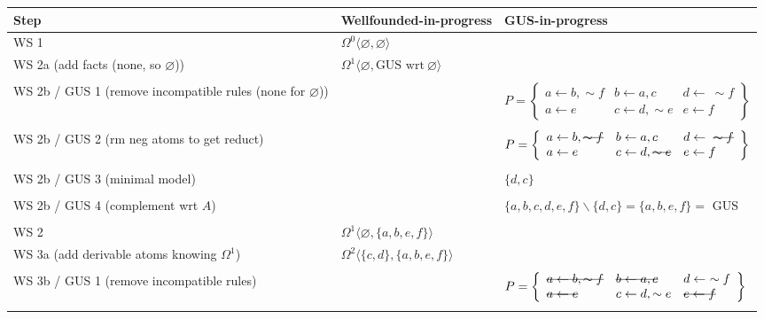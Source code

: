 \documentclass[9pt,a4paper,landscape]{article}
\newcommand{\msout}[1]{\text{\sout{$#1$}}}
\begin{document}
{\begin{center}
	\begin{tabular}{p{5cm}p{5cm}p{7cm}}
		Step & Wellfounded-in-progress & GUS-in-progress\\ \midrule
		WS 1
		& $\Omega^0 \langle \varnothing, \varnothing \rangle$ &\\ \midrule
		WS 2a (add facts (none, so $\varnothing$))
		& $\Omega^1 \langle \varnothing, \text{GUS wrt}\ \varnothing \rangle$ &\\&\\
		WS 2b / GUS 1 (remove incompatible rules (none for $\varnothing$)) 
		&
		& $P = \left\{\begin{array}{lll}
		a \leftarrow b, \sim f & b \leftarrow a, c & d \leftarrow\ \sim f\\
		a \leftarrow e & c \leftarrow d, \sim e & e \leftarrow f
		\end{array}\right\}$ \\ &\\
		WS 2b / GUS 2 (rm neg atoms to get reduct) 
		& 
		& $P = \left\{\begin{array}{lll}
		a \leftarrow b, \msout{\sim f} & b \leftarrow a, c & d \leftarrow\ \msout{\sim f}\\
		a \leftarrow e & c \leftarrow d, \msout{\sim e} & e \leftarrow f
		\end{array}\right\}$  \\ &\\
		WS 2b / GUS 3 (minimal model) 
		& 
		& $\{ d, c \}$ \\ &\\
		WS 2b / GUS 4 (complement wrt $A$) 
		&
		&  $\{a, b, c, d, e, f\} \backslash \{d, c\} = \{a, b, e, f\} = $ GUS  \\&\\
		WS 2
		& $\Omega^1 \langle \varnothing, \{a, b, e, f\} \rangle$ &\\ \midrule
		WS 3a (add derivable atoms knowing $\Omega^1$) 
		& $\Omega^2 \langle \{c, d\}, \{a, b, e, f\} \rangle$ &\\&\\
		WS 3b / GUS 1 (remove incompatible rules) 
		&
		& $P = \left\{\begin{array}{lll}
		\msout{a \leftarrow b, \sim f} & \msout{b \leftarrow a, c} & d \leftarrow\ \sim f\\
		\msout{a \leftarrow e} & c \leftarrow d, \sim e & \msout{e \leftarrow f}
		\end{array}\right\}$ \\ &\\

\end{tabular}
\end{center}}
\end{document}
